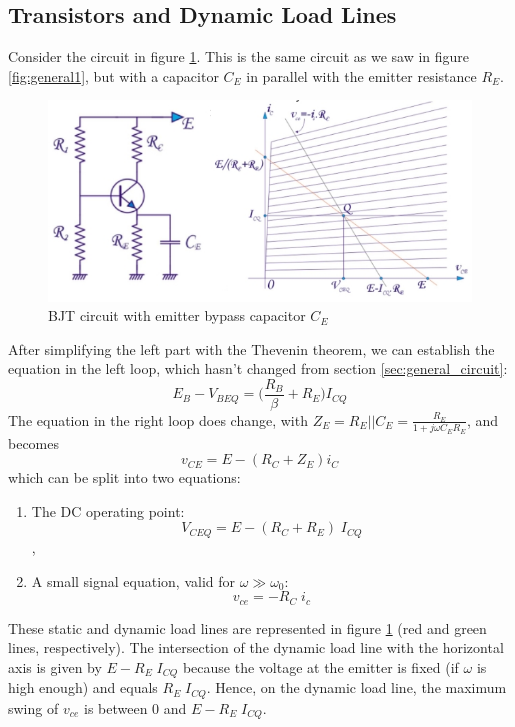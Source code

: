 \subsection{Transistors and Dynamic Load Lines}
Consider the circuit in figure \ref{fig:loadline7}. This is the same circuit as we saw in figure \ref{fig:general1}, but with a capacitor $C_E$ in parallel with the emitter resistance $R_E$.
\begin{figure}[h!]
	\centering
	\includegraphics[width=14cm]{figures/ch02/loadline7.jpg}
	\caption{BJT circuit with emitter bypass capacitor $C_E$}
	\label{fig:loadline7}
\end{figure}
After simplifying the left part with the Thevenin theorem, we can establish the equation in the left loop, which hasn't changed from section \ref{sec:general_circuit}:
\begin{equation}
	E_B - V_{BEQ} = \bigg( \frac{R_B}{\beta} + R_E \bigg) I_{CQ}
\end{equation}
The equation in the right loop does change, with $Z_E = R_E || C_E = \frac{R_E}{1 + j\omega C_E R_E}$, and becomes
\begin{equation}
	v_{CE} = E - (R_C + Z_E)i_C
\end{equation}
which can be split into two equations:
\begin{enumerate}
	\item The DC operating point: 
		$$V_{CEQ} = E - (R_C + R_E)\; I_{CQ}$$,
	\item A small signal equation, valid for $\omega \gg \omega_0$:
		$$v_{ce} = -R_C \; i_c$$
\end{enumerate}
These static and dynamic load lines are represented in figure \ref{fig:loadline7} (red and green lines, respectively). The intersection of the dynamic load line with the horizontal axis is given by $E-R_E \; I_{CQ}$ because the voltage at the emitter is fixed (if $\omega$ is high enough) and equals $R_E \; I_{CQ}$. Hence, on the dynamic load line, the maximum swing of $v_{ce}$ is between $0$ and $E-R_E \; I_{CQ}$.
